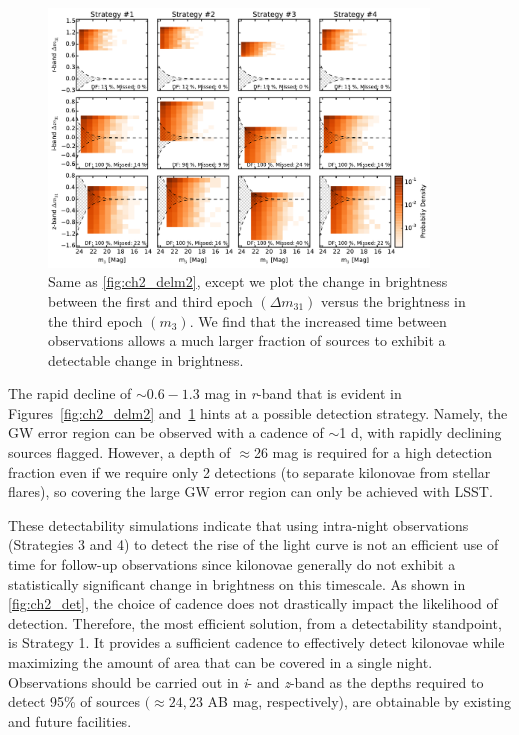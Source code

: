 \begin{figure}[t!]
\centering
\includegraphics[width=0.9\textwidth]{./figs/chapter2/ch2_f7.pdf}
\caption{Same as \autoref{fig:ch2_delm2}, except we plot the change in brightness between the first and third epoch $(\Delta m_{31})$ versus the brightness in the third epoch $(m_3)$. We find that the increased time between observations allows a much larger fraction of sources to exhibit a detectable change in brightness.}
\label{fig:ch2_delm3}
\end{figure}

The rapid decline of $\sim0.6-1.3$ mag in {\em r}-band that is evident in Figures~\ref{fig:ch2_delm2} and~\ref{fig:ch2_delm3} hints at a possible detection strategy. Namely, the GW error region can be observed with a cadence of $\sim$1 d, with rapidly declining sources flagged. However, a depth of $\approx$26 mag is required for a high detection fraction even if we require only 2 detections (to separate kilonovae from stellar flares), so covering the large GW error region can only be achieved with LSST.

These detectability simulations indicate that using intra-night observations (Strategies 3 and 4) to detect the rise of the light curve is not an efficient use of time for follow-up observations since kilonovae generally do not exhibit a statistically significant change in brightness on this timescale. As shown in \autoref{fig:ch2_det}, the choice of cadence does not drastically impact the likelihood of detection. Therefore, the most efficient solution, from a detectability standpoint, is Strategy 1. It provides a sufficient cadence to effectively detect kilonovae while maximizing the amount of area that can be covered in a single night. Observations should be carried out in {\em i}- and {\em z}-band as the depths required to detect 95\% of sources $(\approx 24,23$ AB mag, respectively), are obtainable by existing and future facilities.

